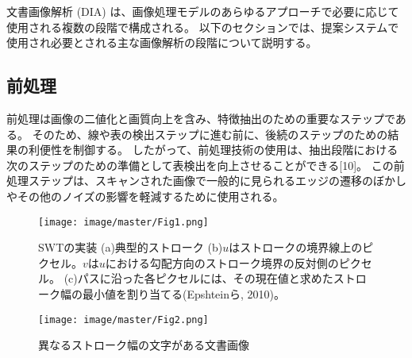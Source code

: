 \documentclass[uplatex, twocolumn,10pt]{jsarticle}
\begin{document}
文書画像解析 (DIA) は、画像処理モデルのあらゆるアプローチで必要に応じて使用される複数の段階で構成される。
以下のセクションでは、提案システムで使用され必要とされる主な画像解析の段階について説明する。


\subsection{前処理}

前処理は画像の二値化と画質向上を含み、特徴抽出のための重要なステップである。
そのため、線や表の検出ステップに進む前に、後続のステップのための結果の利便性を制御する。
したがって、前処理技術の使用は、抽出段階における次のステップのための準備として表検出を向上させることができる[10]。
この前処理ステップは、スキャンされた画像で一般的に見られるエッジの遷移のぼかしやその他のノイズの影響を軽減するために使用される。


\begin{figure}[tp]
    \begin{center}
        \texttt{[image: image/master/Fig1.png]}
        \caption{SWTの実装 (a)典型的ストローク (b)$u$はストロークの境界線上のピクセル。$v$は$u$における勾配方向のストローク境界の反対側のピクセル。
            (c)パスに沿った各ピクセルには、その現在値と求めたストローク幅の最小値を割り当てる(Epshteinら, 2010)。}
        \label{fig1}
    \end{center}
\end{figure}

\begin{figure}[tp]
    \begin{center}
        \texttt{[image: image/master/Fig2.png]}
        \caption{異なるストローク幅の文字がある文書画像}
        \label{fig2}
    \end{center}
\end{figure}
\end{document}
